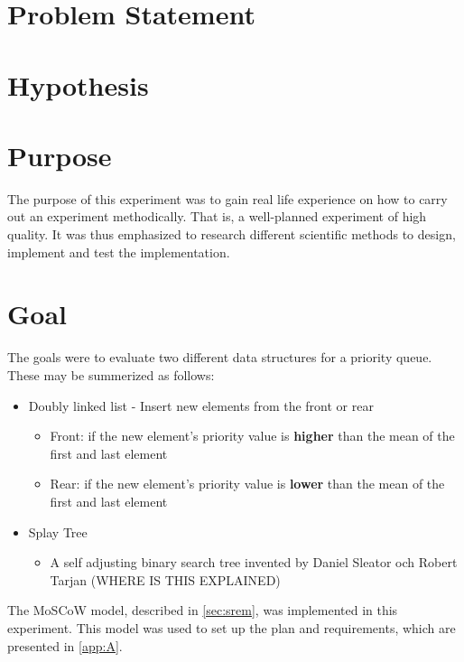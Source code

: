 \documentclass[a4paper,11pt]{kth-mag}
\begin{document}
\section{Problem Statement}

\section{Hypothesis}

\section{Purpose}
The purpose of this experiment was to gain real life experience on how to carry out an experiment methodically.
That is, a well-planned experiment of high quality.
It was thus emphasized to research different scientific methods to design, implement and test the implementation.

\newpage
\section{Goal}
\label{sec:goal}
The goals were to evaluate two different data structures for a priority queue.
These may be summerized as follows:
\begin{itemize}
    \item Doubly linked list - Insert new elements from the front or rear
        \begin{itemize}
            \item Front: if the new element's priority value is \textbf{higher} than the mean of the first and last element
            \item Rear: if the new element's priority value is \textbf{lower} than the mean of the first and last element
        \end{itemize}
    \item Splay Tree \cite{sleator1985self}
        \begin{itemize}
            \item A self adjusting binary search tree invented by Daniel Sleator och Robert Tarjan (WHERE IS THIS EXPLAINED)
        \end{itemize}
\end{itemize}
The MoSCoW model, described in \cref{sec:srem}, was implemented in this experiment.
This model was used to set up the plan and requirements, which are presented in \cref{app:A}.
\end{document}

